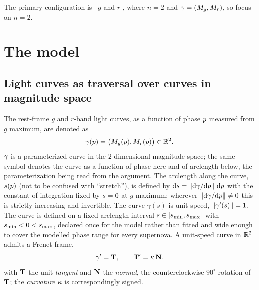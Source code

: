 \documentclass[11pt]{article}
\theoremstyle{plain}
\begin{document}
The primary configuration is \ztf\ $g$ and $r$ \citep{Bellm2019}, where $n=2$ and
$\gamma = (M_{g}, M_{r})$, so focus on $n=2$.

\section{The model}

\subsection{Light curves as traversal over curves in magnitude space}
\label{sec:curve}
The rest-frame $g$ and $r$-band light curves, as a function of phase $p$ measured
from $g$ maximum, are denoted as
\begin{equation}
  \gamma(p)
    = \bigl(M_{g}(p), M_{r}(p)\bigr) \in \mathbb{R}^{2}.
  \label{eq:curvedef}
\end{equation}
$\gamma$ is a parameterized curve in the $2$-dimensional magnitude space; the same
symbol denotes the curve as a function of phase here and of arclength below, the
parameterization being read from the argument.
The arclength along the curve, $s(p)$ (not to be confused with ``stretch''), is defined by
$\mathrm{d} s = \left\| \mathrm{d}\gamma/\mathrm{d} p \right\|\,\mathrm{d} p$ with the constant of integration
fixed by $s = 0$ at $g$ maximum; wherever $\left\| \mathrm{d}\gamma/\mathrm{d}p \right\| \neq 0$ this is
strictly increasing and invertible.  The curve $\gamma(s)$ is
unit-speed, $\left\| \gamma'(s) \right\| = 1$.
The curve is defined on a fixed arclength interval $s \in [s_{\min}, s_{\max}]$
with $s_{\min} < 0 < s_{\max}$, declared once for the model rather than fitted and wide
enough to cover the modelled phase range for every supernova. A unit-speed curve in $\mathbb{R}^{2}$ admits a Frenet frame,
 \begin{equation}
  \gamma' = \mathbf{T}, \qquad
  \mathbf{T}' = \kappa\,\mathbf{N}.
  \label{eq:frenet2d}
\end{equation}
with $\mathbf{T}$ the unit \emph{tangent} and $\mathbf{N}$ the \emph{normal}, the counterclockwise
$90^{\circ}$ rotation of $\mathbf{T}$; the \emph{curvature} $\kappa$ is correspondingly signed.
\end{document}
